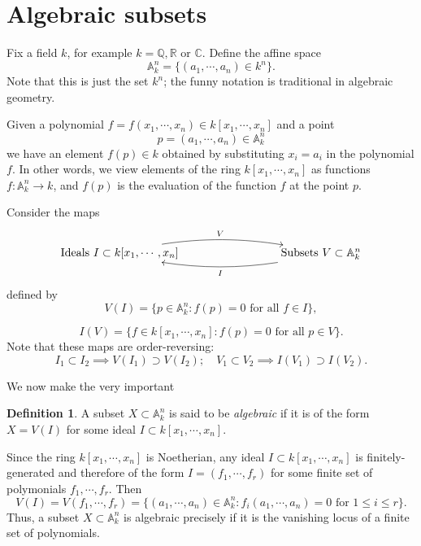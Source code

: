\documentclass [12pt,oneside,a4paper,mathscr]{amsart}
\theoremstyle{definition}
\newtheorem{defn}[thm]{Definition}
\newcommand {\A}{\mathbb A}
\newcommand {\C}{\mathbb C}
\renewcommand{\leq}{\leqslant}
\newcommand{\Q}{\mathbb{Q}}
\newcommand{\R}{\mathbb{R}}
\begin{document}

\section{Algebraic subsets}

Fix a field $k$, for example $k=\Q, \R$ or $\C$. Define the affine space
\[\A^n_k = \{(a_1,\cdots, a_n)\in k^n\}.\]
Note that this is just the set $k^n$; the funny notation is traditional in algebraic geometry.

Given a polynomial $f=f(x_1,\cdots,x_n)\in k[x_1,\cdots,x_n]$ and a point \[p=(a_1,\cdots,a_n)\in \A^n_k\] we have an element $f(p)\in k$ obtained by substituting $x_i=a_i$ in the polynomial $f$. In other words, we view elements of the ring $k[x_1,\cdots,x_n]$ as functions  $f\colon \A^n_k\to k$, and $f(p)$ is the evaluation of the function $f$ at the point $p$.

Consider the maps
\[\xymatrix{ {\text{Ideals }I\subset k[x_1,\cdots,x_n]} \ar@/^1pc/[rrr]^{V} &&& {\text{Subsets }V\subset \A^n_k} \ar@/^1pc/[lll]^{I}}\]
defined by
\[V(I)=\{p\in \A^n_k: f(p)=0 \text{ for all }f\in I\},\]


\[I(V)=\{f\in k[x_1,\cdots,x_n]: f(p)=0 \text{ for all }p\in V\}.\]
Note that these maps  are order-reversing:
\[I_1\subset I_2 \implies V(I_1) \supset V(I_2); \quad V_1\subset V_2 \implies I(V_1)\supset I(V_2).\]

We now make the very important

\begin{defn}
A subset $X \subset \A^n_k$ is said to be \emph{algebraic} if it is of the form $X=V(I)$ for some ideal $I\subset k[x_1,\cdots,x_n]$.
\end{defn}


Since the ring $k[x_1,\cdots,x_n]$ is Noetherian, any ideal $I\subset k[x_1,\cdots,x_n]$ is finitely-generated and therefore of the form $I=(f_1,\cdots, f_r)$ for some finite set of polymonials $f_1,\cdots, f_r$. Then
\[V(I)=V(f_1,\cdots,f_r) = \{(a_1,\cdots, a_n)\in \A^n_k: f_i(a_1,\cdots, a_n)=0\text{ for }1\leq  i \leq r\}.\]
Thus, a subset $X\subset \A^n_k$ is algebraic precisely if it is the vanishing locus of a finite set of polynomials.
\end{document}
